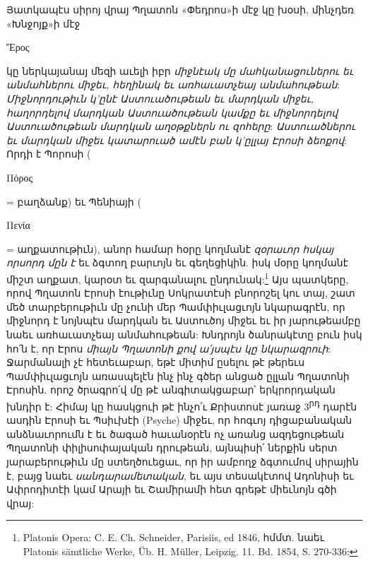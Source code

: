 \documentclass{article}
\begin{document}
{Յատկապէս սիրոյ վրայ Պղատոն «Փեդրոս»ի մէջ կը խօսի, մինչդեռ «Խնջոյք»ի մէջ \begin{greek}Ἔρος\end{greek} կը ներկայանայ մեզի աւելի իբր \emph{միջնէակ մը մահկանացուներու եւ անմահներու միջեւ, հեղինակ եւ առհաւատչեայ անմահութեան}: \emph{Միջնորդութիւն կ'ընէ Աստուածութեան եւ մարդկան միջեւ, հաղորդելով մարդկան Աստուածութեան կամքը եւ միջնորդելով Աստուածութեան մարդկան աղօթքներն ու զոհերը}: \emph{Աստուածներու եւ մարդկան միջեւ կատարուած ամէն բան կ'ըլլայ Էրոսի ձեոքով}: Որդի է Պորոսի (\begin{greek}Πόρος\end{greek} = բաղձանք) եւ Պենիայի (\begin{greek}Πενία\end{greek} = աղքատութիւն), անոր համար հօրը կողմանէ \emph{զօրաւոր հսկայ որսորդ մըն է} եւ ձգտող բարւոյն եւ գեղեցիկին. իսկ մօրը կողմանէ միշտ աղքատ, կարօտ եւ զարգանալու ընդունակ:\footnote{Platonis Opera: C. E. Ch. Schneider, Parisiis, ed 1846, հմմտ. նաեւ Platonis sämtliche Werke, Üb. H. Müller, Leipzig. 11. Bd. 1854, S. 270-336:} Այս պատկերը, որով Պղատոն Էրոսի էութիւնը Սոկրատէսի բնորոշել կու տայ, շատ մեծ տարբերութիւն մը չունի մեր Պամփիւլացւոյն նկարագրէն, որ միջնորդ է նոյնպէս մարդկան եւ Աստուծոյ միջեւ եւ իր յարութեամբը նաեւ առհաւատչեայ անմահութեան: Խնդրոյն ծանրակէտը բուն իսկ հո՛ն է, որ Էրոս \emph{միայն Պղատոնի քով ա՛յսպէս կը նկարազրուի}: Ջարմանալի չէ հետեւաբար, եթէ միտիմ ըսելու թէ թերեւս Պամփիւլացւոյն առասպելէն ինչ ինչ գծեր անցած ըլլան Պղատոնի Էրոսին. որոշ ծրագրո՛վ մը թէ անգիտակցաբար՝ երկրորդական խնդիր է: Հիմայ կը հասկցուի թէ ինչո՛ւ Քրիստոսէ յառաջ 3\textsuperscript{րդ} դարէն ասդին Էրոսի եւ Պսիւխէի (Psyche) միջեւ, որ հոգւոյ դիցաբանական անձնաւորումն է եւ ծագած հաւանօրէն ոչ առանց ազդեցութեան Պղատոնի փիլիսոփայական դրութեան, այնպիսի՛ ներքին սերտ յարաբերութիւն մը ստեղծուեցաւ, որ իր ամբողջ ձգտումով սիրային է, բայց նաեւ \emph{սանդարամետական}, եւ այս տեսակէտով Ադոնիսի եւ Ափրոդիտէի կամ Արայի եւ Շամիրամի հետ գրեթէ միեւնոյն գծի վրայ:

}
\end{document}
